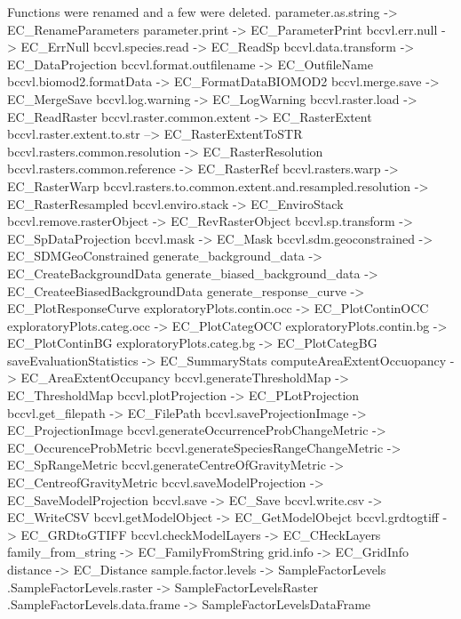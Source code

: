 \documentclass[
]{article}
\begin{document}
Functions were renamed and a few were deleted. parameter.as.string
-\textgreater{} EC\_RenameParameters parameter.print -\textgreater{}
EC\_ParameterPrint bccvl.err.null -\textgreater{} EC\_ErrNull
bccvl.species.read -\textgreater{} EC\_ReadSp bccvl.data.transform
-\textgreater{} EC\_DataProjection bccvl.format.outfilename
-\textgreater{} EC\_OutfileName bccvl.biomod2.formatData -\textgreater{}
EC\_FormatDataBIOMOD2 bccvl.merge.save -\textgreater{} EC\_MergeSave
bccvl.log.warning -\textgreater{} EC\_LogWarning bccvl.raster.load
-\textgreater{} EC\_ReadRaster bccvl.raster.common.extent
-\textgreater{} EC\_RasterExtent bccvl.raster.extent.to.str
--\textgreater{} EC\_RasterExtentToSTR bccvl.rasters.common.resolution
-\textgreater{} EC\_RasterResolution bccvl.rasters.common.reference
-\textgreater{} EC\_RasterRef bccvl.rasters.warp -\textgreater{}
EC\_RasterWarp bccvl.rasters.to.common.extent.and.resampled.resolution
-\textgreater{} EC\_RasterResampled bccvl.enviro.stack -\textgreater{}
EC\_EnviroStack bccvl.remove.rasterObject -\textgreater{}
EC\_RevRasterObject bccvl.sp.transform -\textgreater{}
EC\_SpDataProjection bccvl.mask -\textgreater{} EC\_Mask
bccvl.sdm.geoconstrained -\textgreater{} EC\_SDMGeoConstrained
generate\_background\_data -\textgreater{} EC\_CreateBackgroundData
generate\_biased\_background\_data -\textgreater{}
EC\_CreateeBiasedBackgroundData generate\_response\_curve
-\textgreater{} EC\_PlotResponseCurve exploratoryPlots.contin.occ
-\textgreater{} EC\_PlotContinOCC exploratoryPlots.categ.occ
-\textgreater{} EC\_PlotCategOCC exploratoryPlots.contin.bg
-\textgreater{} EC\_PlotContinBG exploratoryPlots.categ.bg
-\textgreater{} EC\_PlotCategBG saveEvaluationStatistics -\textgreater{}
EC\_SummaryStats computeAreaExtentOccuopancy -\textgreater{}
EC\_AreaExtentOccupancy bccvl.generateThresholdMap -\textgreater{}
EC\_ThresholdMap bccvl.plotProjection -\textgreater{} EC\_PLotProjection
bccvl.get\_filepath -\textgreater{} EC\_FilePath
bccvl.saveProjectionImage -\textgreater{} EC\_ProjectionImage
bccvl.generateOccurrenceProbChangeMetric -\textgreater{}
EC\_OccurenceProbMetric bccvl.generateSpeciesRangeChangeMetric
-\textgreater{} EC\_SpRangeMetric bccvl.generateCentreOfGravityMetric
-\textgreater{} EC\_CentreofGravityMetric bccvl.saveModelProjection
-\textgreater{} EC\_SaveModelProjection bccvl.save -\textgreater{}
EC\_Save bccvl.write.csv -\textgreater{} EC\_WriteCSV
bccvl.getModelObject -\textgreater{} EC\_GetModelObejct bccvl.grdtogtiff
-\textgreater{} EC\_GRDtoGTIFF bccvl.checkModelLayers -\textgreater{}
EC\_CHeckLayers family\_from\_string -\textgreater{}
EC\_FamilyFromString grid.info -\textgreater{} EC\_GridInfo distance
-\textgreater{} EC\_Distance sample.factor.levels -\textgreater{}
SampleFactorLevels .SampleFactorLevels.raster -\textgreater{}
SampleFactorLevelsRaster .SampleFactorLevels.data.frame -\textgreater{}
SampleFactorLevelsDataFrame
\end{document}
